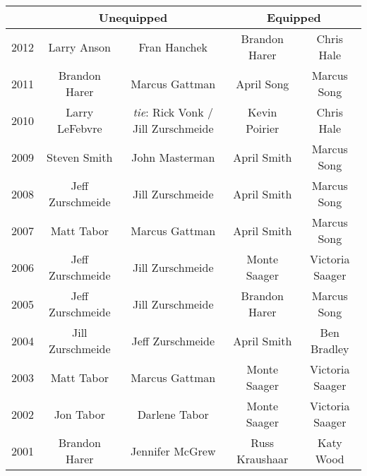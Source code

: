 \begin{tabular}{ |c|c|c|c|c| }
  \hline
  \multicolumn{1}{|c|}{} &
  \multicolumn{2}{|c|}{Unequipped} &
  \multicolumn{2}{|c|}{Equipped} \\
  \hline
  2012 & Larry Anson & Fran Hanchek & Brandon Harer & Chris Hale \\
  2011 & Brandon Harer & Marcus Gattman & April Song & Marcus Song \\
  2010 & Larry LeFebvre & \textit{tie}: Rick Vonk / \linebreak Jill Zurschmeide & Kevin Poirier & Chris Hale \\
  2009 & Steven Smith & John Masterman & April Smith & Marcus Song \\
  2008 & Jeff Zurschmeide & Jill Zurschmeide & April Smith & Marcus Song \\
  2007 & Matt Tabor & Marcus Gattman & April Smith & Marcus Song \\
  2006 & Jeff Zurschmeide & Jill Zurschmeide & Monte Saager & Victoria Saager \\
  2005 & Jeff Zurschmeide & Jill Zurschmeide & Brandon Harer & Marcus Song \\
  2004 & Jill Zurschmeide & Jeff Zurschmeide & April Smith & Ben Bradley \\
  2003 & Matt Tabor & Marcus Gattman & Monte Saager & Victoria Saager \\
  2002 & Jon Tabor & Darlene Tabor & Monte Saager & Victoria Saager \\
  2001 & Brandon Harer & Jennifer McGrew & Russ Kraushaar & Katy Wood \\
  \hline
\end{tabular}
